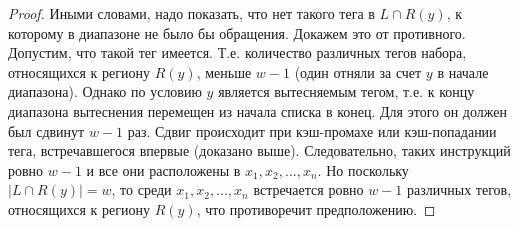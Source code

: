 \begin{proof}
  Иными словами, надо показать, что нет такого тега в $L \cap R(y)$,
  к которому в диапазоне не было бы обращения. Докажем это от противного.
  Допустим, что такой тег имеется. Т.е. количество различных тегов набора,
  относящихся к региону $R(y)$, меньше $w{-}1$ (один отняли за счет $y$ в начале диапазона).
  Однако по условию $y$ является вытесняемым тегом, т.е. к
  концу диапазона вытеснения перемещен из начала списка в конец. Для
  этого он должен был сдвинут $w{-}1$ раз. Сдвиг происходит при
  кэш-промахе или кэш-попадании тега, встречавшегося впервые
  (доказано выше). Следовательно, таких инструкций ровно $w-1$ и все они расположены
  в $x_1, x_2, ..., x_n$. Но поскольку $| L \cap R(y) | = w$, то
  среди $x_1, x_2, ..., x_n$ встречается ровно $w-1$ различных
  тегов, относящихся к региону $R(y)$, что противоречит
  предположению.
\end{proof}

